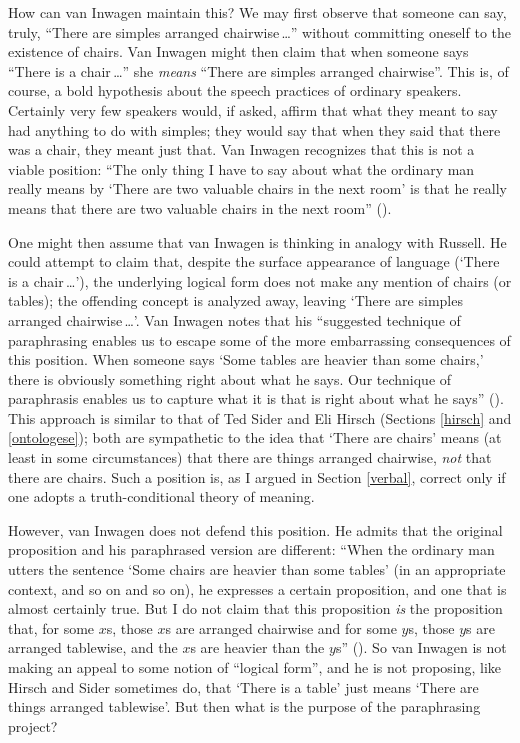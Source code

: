 \documentclass[12pt,twoside]{reedfancy}
\begin{document}
\begin{spacing}{1.25}
How can van Inwagen maintain this?  We may first observe that someone
can say, truly, ``There are simples arranged chairwise\,\ldots ''
without committing oneself to the existence of chairs.  Van Inwagen
might then claim that when someone says ``There is a chair\,\ldots ''
she {\em means} ``There are simples arranged chairwise''.  This is, of
course, a bold hypothesis about the speech practices of ordinary
speakers.  Certainly very few speakers would, if asked, affirm that
what they meant to say had anything to do with simples; they would say
that when they said that there was a chair, they meant just that.  Van
Inwagen recognizes that this is not a viable position: ``The only
thing I have to say about what the ordinary man really means by `There
are two valuable chairs in the next room' is that he really means that
there are two valuable chairs in the next room''
(\citeyear[106]{inwagen1995}).

One might then assume that van Inwagen is thinking in analogy with
Russell.  He could attempt to claim that, despite the surface
appearance of language (`There is a chair\,\ldots '), the underlying
logical form does not make any mention of chairs (or tables); the
offending concept is analyzed away, leaving `There are simples
arranged chairwise\,\ldots '.  Van Inwagen notes that his ``suggested
technique of paraphrasing enables us to escape some of the more
embarrassing consequences of this position.  When someone says `Some
tables are heavier than some chairs,' there is obviously something
right about what he says.  Our technique of paraphrasis enables us to
capture what it is that is right about what he says''
(\citeyear[111]{inwagen1995}).  This approach is similar to that of
Ted Sider and Eli Hirsch (Sections \ref{hirsch} and \ref{ontologese});
both are sympathetic to the idea that `There are chairs' means (at
least in some circumstances) that there are things arranged chairwise,
{\em not} that there are chairs.  Such a position is, as I argued in
Section \ref{verbal}, correct only if one adopts a truth-conditional
theory of meaning.

However, van Inwagen does not defend this position.  He admits that
the original proposition and his paraphrased version are different:
``When the ordinary man utters the sentence `Some chairs are heavier
than some tables' (in an appropriate context, and so on and so on), he
expresses a certain proposition, and one that is almost certainly
true.  But I do not claim that this proposition {\em is} the
proposition that, for some $x$s, those $x$s are arranged chairwise and
for some $y$s, those $y$s are arranged tablewise, and the $x$s are
heavier than the $y$s'' (\citeyear[112]{inwagen1995}).  So van Inwagen
is not making an appeal to some notion of ``logical form'', and he is
not proposing, like Hirsch and Sider sometimes do, that `There is a
table' just means `There are things arranged tablewise'.  But then
what is the purpose of the paraphrasing project?


\end{spacing}
\end{document}
